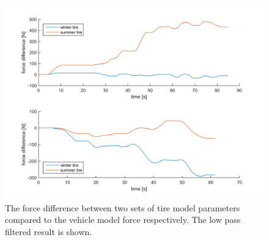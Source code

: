 \begin{figure}[h]
	\centering
	\includegraphics[width=1.0\textwidth]{Pictures/force_difference}
	\caption {The force difference between two sets of tire model parameters compared to the vehicle model force respectively. The low pass filtered result is shown.}
	\label{force_difference}
\end{figure}

